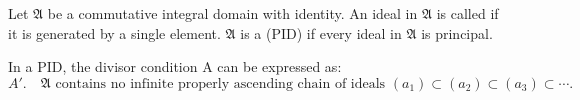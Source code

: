 Let $\mathfrak{A}$ be a commutative integral domain with identity. An ideal in $\mathfrak{A}$ is called  if it is generated by a single element. $\mathfrak{A}$ is a  (PID) if every ideal in $\mathfrak{A}$ is principal.

In a PID, the divisor condition A can be expressed as:
$$A'. \quad \mathfrak{A} \text{ contains no infinite properly ascending chain of ideals } (a_1) \subset (a_2) \subset (a_3) \subset \cdots.$$
